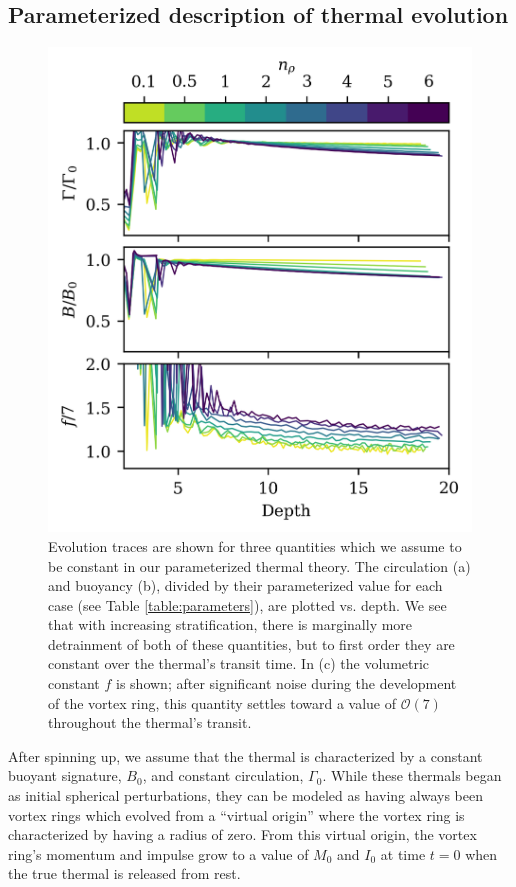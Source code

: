 \documentclass[twocolumn, amsmath, amsfonts, amssymb, trackchanges]{aastex62}
\begin{document}
\subsection{Parameterized description of thermal evolution}
\begin{figure}[t!]
    \includegraphics[width=\columnwidth]{constants.png}
    \caption{
	Evolution traces are shown for  three quantities which we assume to be constant in our parameterized thermal theory. 
	The circulation (a) and buoyancy (b), divided by their parameterized value for each case (see Table \ref{table:parameters}), are plotted vs. depth. 
	We see that with increasing stratification, there is marginally more detrainment of both of these quantities, but to first order they are constant over the	thermal's transit time. 
	In (c) the volumetric constant $f$ is shown; after significant noise during the development of the vortex ring, this quantity settles toward a value of $\mathcal{O}(7)$ throughout the thermal's transit.
    \label{fig:constants} }
\end{figure}

After spinning up, we assume that the thermal is characterized by a constant buoyant signature, $B_0$, and constant circulation, $\Gamma_0$.
While these thermals began as initial spherical perturbations, they can be modeled as having always been vortex rings which evolved from a ``virtual origin'' where the vortex ring is characterized by having a radius of zero. 
From this virtual origin, the vortex ring's momentum and impulse grow to a value of $M_0$ and $I_0$ at time $t = 0$ when the true thermal is released from rest.
\end{document}
